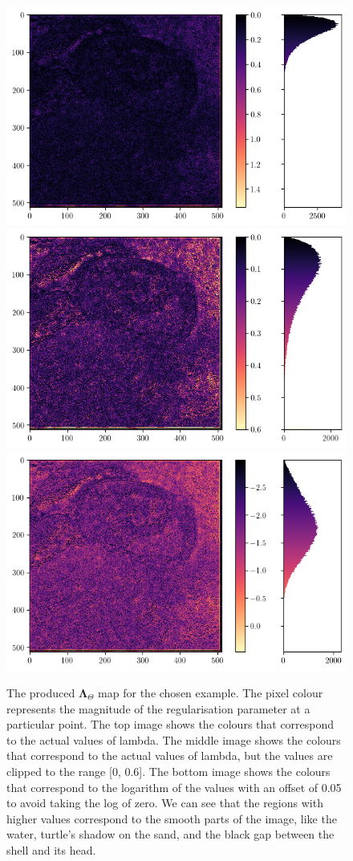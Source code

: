 \documentclass[12pt]{article}
\begin{document}
\begin{figure}[H]
    \centering
    \includegraphics[width=0.51\linewidth]{images/turtle_id/reg_map.png}
    \includegraphics[width=0.51\linewidth]{images/turtle_id/reg_map_clip.png}
    \includegraphics[width=0.51\linewidth]{images/turtle_id/reg_map_log.png}
    \caption{
        The produced $\mathbf{\Lambda}_{\Theta}$ map for the chosen example. 
        The pixel colour represents the magnitude of the regularisation parameter at a particular point.
        The top image shows the colours that correspond to the actual values of lambda.
        The middle image shows the colours that correspond to the actual values of lambda, but the values are clipped to the range [0, 0.6].
        The bottom image shows the colours that correspond to the logarithm of the values with an offset of 0.05 to avoid taking the log of zero.
        We can see that the regions with higher values correspond to the smooth parts of the image, like the water, turtle's shadow on the sand, and the black gap between the shell and its head.
    }
\end{figure}
\end{document}

